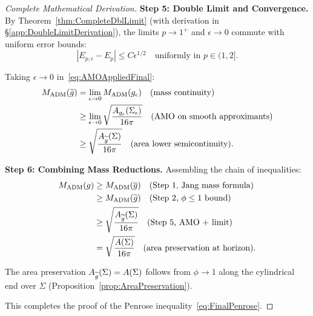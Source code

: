 \begin{proof}[Complete Mathematical Derivation]
\textbf{Step 5: Double Limit and Convergence.}
By Theorem~\ref{thm:CompleteDblLimit} (with derivation in \S\ref{app:DoubleLimitDerivation}), the limits $p \to 1^+$ and $\epsilon \to 0$ commute with uniform error bounds:
\begin{equation}\label{eq:DoubleLimitFinal}
    |E_{p,\epsilon} - E_p| \le C \epsilon^{1/2} \quad \text{uniformly in } p \in (1, 2].
\end{equation}

Taking $\epsilon \to 0$ in~\eqref{eq:AMOAppliedFinal}:
\begin{align}
    M_{\mathrm{ADM}}(\widetilde{g}) &= \lim_{\epsilon \to 0} M_{\mathrm{ADM}}(g_{\epsilon}) \quad \text{(mass continuity)} \nonumber\\
    &\ge \lim_{\epsilon \to 0} \sqrt{\frac{A_{g_{\epsilon}}(\Sigma_\epsilon)}{16\pi}} \quad \text{(AMO on smooth approximants)} \nonumber\\
    &\ge \sqrt{\frac{A_{\widetilde{g}}(\Sigma)}{16\pi}} \quad \text{(area lower semicontinuity)}. \label{eq:LimitPassageFinal}
\end{align}

\textbf{Step 6: Combining Mass Reductions.}
Assembling the chain of inequalities:
\begin{align}
    M_{\mathrm{ADM}}(g) &\ge M_{\mathrm{ADM}}(\overline{g}) \quad \text{(Step 1, Jang mass formula)} \nonumber\\
    &\ge M_{\mathrm{ADM}}(\widetilde{g}) \quad \text{(Step 2, $\phi \le 1$ bound)} \nonumber\\
    &\ge \sqrt{\frac{A_{\widetilde{g}}(\Sigma)}{16\pi}} \quad \text{(Step 5, AMO + limit)} \nonumber\\
    &= \sqrt{\frac{A(\Sigma)}{16\pi}} \quad \text{(area preservation at horizon)}. \label{eq:FinalChainFinal}
\end{align}

The area preservation $A_{\widetilde{g}}(\Sigma) = A(\Sigma)$ follows from $\phi \to 1$ along the cylindrical end over $\Sigma$ (Proposition~\ref{prop:AreaPreservation}).

This completes the proof of the Penrose inequality~\eqref{eq:FinalPenrose}.
\end{proof}

